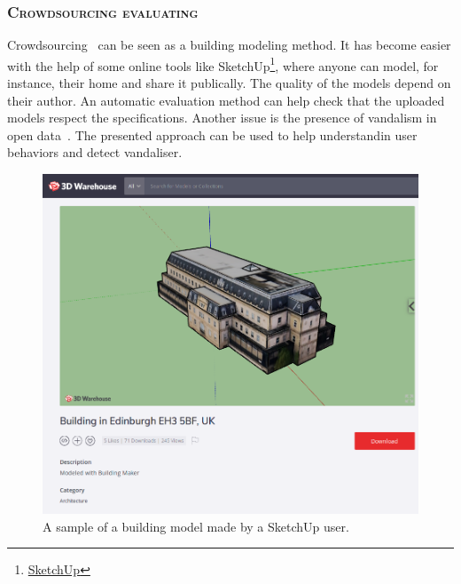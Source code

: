             \subsubsection{\textsc{Crowdsourcing evaluating}}
            Crowdsourcing~\parencite{kovashka2016crowdsourcing} can be seen as a building modeling method.
            It has become easier with the help of some online tools like SketchUp\footnote{
                \href{https://www.sketchup.com}{SketchUp}
            }, where anyone can model, for instance, their home and share it publically.
            The quality of the models depend on their author.
            An automatic evaluation method can help check that the uploaded models respect the specifications.
            Another issue is the presence of vandalism in open data~\parencite{neis2012towards}.
            The presented approach can be used to help understandin user behaviors and detect vandaliser.
            \begin{figure}[htpb]
                \centering
                \includegraphics[width=.7\textwidth]{images/introduction/use/crowdsourcing}
                \caption{
                    \label{fig::crowdsourcing}
                    A sample of a building model made by a SketchUp user.
                }
            \end{figure}

